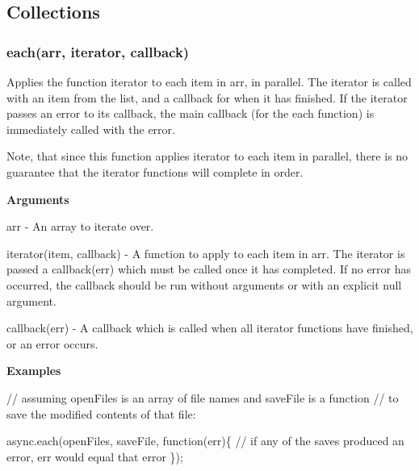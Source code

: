 \subsection*{Collections}

\label{_forEach}%
 \label{_each}%
 \subsubsection*{each(arr, iterator, callback)}

Applies the function {\ttfamily iterator} to each item in {\ttfamily arr}, in parallel. The {\ttfamily iterator} is called with an item from the list, and a callback for when it has finished. If the {\ttfamily iterator} passes an error to its {\ttfamily callback}, the main {\ttfamily callback} (for the {\ttfamily each} function) is immediately called with the error.

Note, that since this function applies {\ttfamily iterator} to each item in parallel, there is no guarantee that the iterator functions will complete in order.

{\bfseries Arguments}


\begin{DoxyItemize}
\item {\ttfamily arr} -\/ An array to iterate over.
\item {\ttfamily iterator(item, callback)} -\/ A function to apply to each item in {\ttfamily arr}. The iterator is passed a {\ttfamily callback(err)} which must be called once it has completed. If no error has occurred, the {\ttfamily callback} should be run without arguments or with an explicit {\ttfamily null} argument.
\item {\ttfamily callback(err)} -\/ A callback which is called when all {\ttfamily iterator} functions have finished, or an error occurs.
\end{DoxyItemize}

{\bfseries Examples}


\begin{DoxyCode}
\textcolor{comment}{// assuming openFiles is an array of file names and saveFile is a function}
\textcolor{comment}{// to save the modified contents of that file:}

async.each(openFiles, saveFile, \textcolor{keyword}{function}(err)\{
    \textcolor{comment}{// if any of the saves produced an error, err would equal that error}
\});
\end{DoxyCode}



